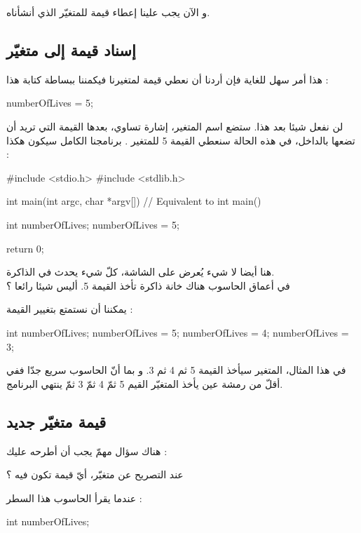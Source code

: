 و الآن يجب علينا إعطاء قيمة للمتغيّر الذي أنشأناه.

\subsection{إسناد قيمة إلى متغيّر}
هذا أمر سهل للغاية فإن أردنا أن نعطي قيمة لمتغيرنا
فيكمننا ببساطة كتابة هذا :

\begin{Csource}
numberOfLives = 5;
\end{Csource}

لن نفعل شيئا بعد هذا. ستضع اسم المتغير، إشارة تساوي، بعدها القيمة التي تريد أن تضعها بالداخل، في هذه الحالة سنعطي القيمة 5 للمتغير
.
برنامجنا الكامل سيكون هكذا :

\begin{Csource}
#include <stdio.h>
#include <stdlib.h>

int main(int argc, char *argv[]) // Equivalent to int main()
{
  int numberOfLives;
  numberOfLives = 5;

  return 0;
}
\end{Csource}

هنا أيضا لا شيء يُعرض على الشاشة، كلّ شيء يحدث في الذاكرة.\\
في أعماق الحاسوب هناك خانة ذاكرة تأخذ القيمة 5. أليس شيئا رائعا ؟

يمكننا أن نستمتع بتغيير القيمة :

\begin{Csource}
int numberOfLives;
numberOfLives = 5;
numberOfLives = 4;
numberOfLives = 3;
\end{Csource}

في هذا المثال، المتغير سيأخذ القيمة 5 ثم 4 ثم 3. و بما أنّ الحاسوب سريع جدّا ففي أقلّ من رمشة عين يأخذ المتغيّر القيم 5 ثمّ 4 ثمّ 3 ثمّ ينتهي البرنامج.

\subsection{قيمة متغيّر جديد}

هناك سؤال مهمّ يجب أن أطرحه عليك :

\begin{question}
  عند التصريح عن متغيّر، أيّ قيمة تكون فيه ؟
\end{question}

عندما يقرأ الحاسوب هذا السطر :

\begin{Csource}
int numberOfLives;
\end{Csource}

